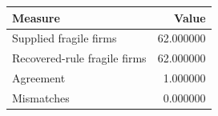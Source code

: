 \begin{tabular}{lr}
\toprule
Measure & Value \\
\midrule
Supplied fragile firms & 62.000000 \\
Recovered-rule fragile firms & 62.000000 \\
Agreement & 1.000000 \\
Mismatches & 0.000000 \\
\bottomrule
\end{tabular}
